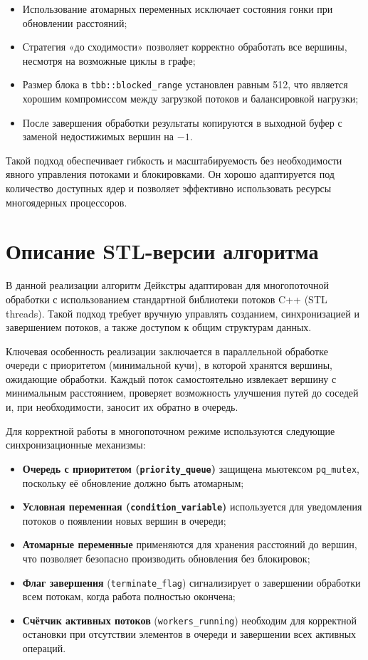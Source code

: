 \documentclass[12pt,a4paper]{extarticle}
\begin{document}
\begin{itemize}
    \item Использование атомарных переменных исключает состояния гонки при обновлении
    расстояний;
    \item Стратегия «до сходимости» позволяет корректно обработать все вершины, несмотря
    на возможные циклы в графе;
    \item Размер блока в \texttt{tbb::blocked\_range} установлен равным 512, что является
    хорошим компромиссом между загрузкой потоков и балансировкой нагрузки;
    \item После завершения обработки результаты копируются в выходной буфер с заменой
    недостижимых вершин на $-1$.
\end{itemize}

Такой подход обеспечивает гибкость и масштабируемость без необходимости явного
управления потоками и блокировками. Он хорошо адаптируется под количество доступных ядер
и позволяет эффективно использовать ресурсы многоядерных процессоров.

\section{Описание STL-версии алгоритма}

В данной реализации алгоритм Дейкстры адаптирован для многопоточной обработки с
использованием стандартной библиотеки потоков C++ (STL threads). Такой подход требует
вручную управлять созданием, синхронизацией и завершением потоков, а также доступом к
общим структурам данных.

Ключевая особенность реализации заключается в параллельной обработке очереди с приоритетом
(минимальной кучи), в которой хранятся вершины, ожидающие обработки. Каждый поток
самостоятельно извлекает вершину с минимальным расстоянием, проверяет возможность улучшения
путей до соседей и, при необходимости, заносит их обратно в очередь.

Для корректной работы в многопоточном режиме используются следующие синхронизационные
механизмы:

\begin{itemize}
    \item \textbf{Очередь с приоритетом (\texttt{priority\_queue})} защищена мьютексом
    \texttt{pq\_mutex}, поскольку её обновление должно быть атомарным;
    \item \textbf{Условная переменная (\texttt{condition\_variable})} используется для уведомления
    потоков о появлении новых вершин в очереди;
    \item \textbf{Атомарные переменные} применяются для хранения расстояний до вершин, что позволяет
    безопасно производить обновления без блокировок;
    \item \textbf{Флаг завершения} (\texttt{terminate\_flag}) сигнализирует о завершении обработки
    всем потокам, когда работа полностью окончена;
    \item \textbf{Счётчик активных потоков} (\texttt{workers\_running}) необходим для корректной
    остановки при отсутствии элементов в очереди и завершении всех активных операций.
\end{itemize}
\end{document}

